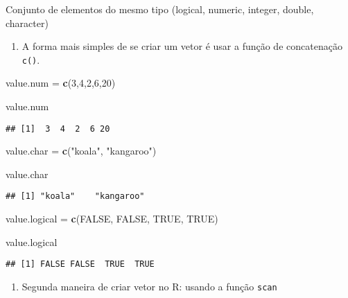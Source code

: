 \documentclass[]{article}
\newenvironment{Shaded}{\begin{snugshade}}{\end{snugshade}}
\newcommand{\KeywordTok}[1]{\textcolor[rgb]{0.13,0.29,0.53}{\textbf{#1}}}
\newcommand{\DecValTok}[1]{\textcolor[rgb]{0.00,0.00,0.81}{#1}}
\newcommand{\StringTok}[1]{\textcolor[rgb]{0.31,0.60,0.02}{#1}}
\newcommand{\OtherTok}[1]{\textcolor[rgb]{0.56,0.35,0.01}{#1}}
\newcommand{\NormalTok}[1]{#1}
\providecommand{\tightlist}{%
  \setlength{\itemsep}{0pt}\setlength{\parskip}{0pt}}
\begin{document}
Conjunto de elementos do mesmo tipo (logical, numeric, integer, double,
character)

\begin{enumerate}
\def\labelenumi{\arabic{enumi}.}
\tightlist
\item
  A forma mais simples de se criar um vetor é usar a função de
  concatenação \texttt{c()}.
\end{enumerate}

\begin{Shaded}
\begin{Highlighting}[]
\NormalTok{value.num  =}\StringTok{ }\KeywordTok{c}\NormalTok{(}\DecValTok{3}\NormalTok{,}\DecValTok{4}\NormalTok{,}\DecValTok{2}\NormalTok{,}\DecValTok{6}\NormalTok{,}\DecValTok{20}\NormalTok{)}

\NormalTok{value.num}
\end{Highlighting}
\end{Shaded}

\begin{verbatim}
## [1]  3  4  2  6 20
\end{verbatim}

\begin{Shaded}
\begin{Highlighting}[]
\NormalTok{value.char =}\StringTok{ }\KeywordTok{c}\NormalTok{(}\StringTok{"koala"}\NormalTok{, }\StringTok{"kangaroo"}\NormalTok{)}

\NormalTok{value.char}
\end{Highlighting}
\end{Shaded}

\begin{verbatim}
## [1] "koala"    "kangaroo"
\end{verbatim}

\begin{Shaded}
\begin{Highlighting}[]
\NormalTok{value.logical =}\StringTok{ }\KeywordTok{c}\NormalTok{(}\OtherTok{FALSE}\NormalTok{, }\OtherTok{FALSE}\NormalTok{, }\OtherTok{TRUE}\NormalTok{, }\OtherTok{TRUE}\NormalTok{)}

\NormalTok{value.logical}
\end{Highlighting}
\end{Shaded}

\begin{verbatim}
## [1] FALSE FALSE  TRUE  TRUE
\end{verbatim}

\begin{enumerate}
\def\labelenumi{\arabic{enumi}.}
\setcounter{enumi}{1}
\tightlist
\item
  Segunda maneira de criar vetor no R: usando a função \texttt{scan}
\end{enumerate}
\end{document}
